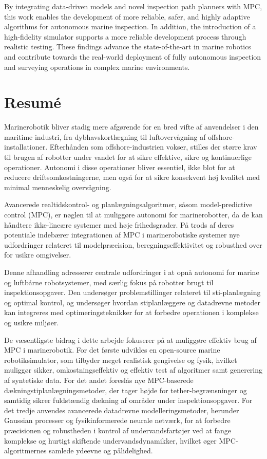 By integrating data-driven models and novel inspection path planners with MPC, this work enables the development of more reliable, safer, and highly adaptive algorithms for autonomous marine inspection. In addition, the introduction of a high-fidelity simulator supports a more reliable development process through realistic testing. These findings advance the state-of-the-art in marine robotics and contribute towards the real-world deployment of fully autonomous inspection and surveying operations in complex marine environments.

\newpage

\chapter*{Resum\'e}
Marinerobotik bliver stadig mere afgørende for en bred vifte af anvendelser i den maritime industri, fra dybhavskortlægning til luftovervågning af offshore-installationer. Efterhånden som offshore-industrien vokser, stilles der større krav til brugen af robotter under vandet for at sikre effektive, sikre og kontinuerlige operationer. Autonomi i disse operationer bliver essentiel, ikke blot for at reducere driftsomkostningerne, men også for at sikre konsekvent høj kvalitet med minimal menneskelig overvågning.

Avancerede realtidskontrol- og planlægningsalgoritmer, såsom model-predictive control (MPC), er nøglen til at muliggøre autonomi for marinerobotter, da de kan håndtere ikke-lineære systemer med høje frihedsgrader. På trods af deres potentiale indebærer integrationen af MPC i marinerobotiske systemer nye udfordringer relateret til modelpræcision, beregningseffektivitet og robusthed over for usikre omgivelser.

Denne afhandling adresserer centrale udfordringer i at opnå autonomi for marine og luftbårne robotsystemer, med særlig fokus på robotter brugt til inspektionsopgaver. Den undersøger problemstillinger relateret til sti-planlægning og optimal kontrol, og undersøger hvordan stiplanlæggere og datadrevne metoder kan integreres med optimeringsteknikker for at forbedre operationen i komplekse og usikre miljøer.

De væsentligste bidrag i dette arbejde fokuserer på at muliggøre effektiv brug af MPC i marinerobotik. For det første udvikles en open-source marine robotiksimulator, som tilbyder meget realistisk gengivelse og fysik, hvilket muliggør sikker, omkostningseffektiv og effektiv test af algoritmer samt generering af syntetiske data. For det andet foreslås nye MPC-baserede dækningstiplanlægningsmetoder, der tager højde for tether-begrænsninger og samtidig sikrer fuldstændig dækning af områder under inspektionsopgaver. For det tredje anvendes avancerede datadrevne modelleringsmetoder, herunder Gaussian processer og fysikinformerede neurale netværk, for at forbedre præcisionen og robustheden i kontrol af undervandsfartøjer ved at fange komplekse og hurtigt skiftende undervandsdynamikker, hvilket øger MPC-algoritmernes samlede ydeevne og pålidelighed.

